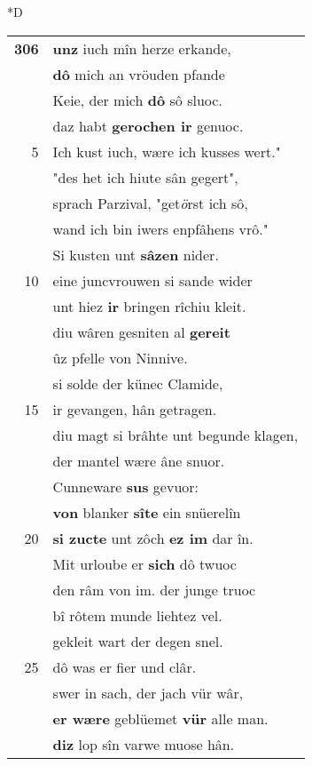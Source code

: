 \documentclass[8pt,a4paper,notitlepage]{article}
\begin{document}
\begin{table}[ht]
\begin{minipage}[t]{0.5\linewidth}
\small
\begin{center}*D
\end{center}
\begin{tabular}{rl}
\textbf{306} & \textbf{unz} iuch mîn herze erkande,\\ 
 & \textbf{dô} mich an vröuden pfande\\ 
 & Keie, der mich \textbf{dô} sô sluoc.\\ 
 & daz habt \textbf{gerochen ir} genuoc.\\ 
5 & Ich kust iuch, wære ich kusses wert."\\ 
 & "des het ich hiute sân gegert",\\ 
 & sprach Parzival, "get\textit{ö}rst ich sô,\\ 
 & wand ich bin iwers enpfâhens vrô."\\ 
 & Si kusten unt \textbf{sâzen} nider.\\ 
10 & eine juncvrouwen si sande wider\\ 
 & unt hiez \textbf{ir} bringen rîchiu kleit.\\ 
 & diu wâren gesniten al \textbf{gereit}\\ 
 & ûz pfelle von Ninnive.\\ 
 & si solde der künec Clamide,\\ 
15 & ir gevangen, hân getragen.\\ 
 & diu magt si brâhte unt begunde klagen,\\ 
 & der mantel wære âne snuor.\\ 
 & Cunneware \textbf{sus} gevuor:\\ 
 & \textbf{von} blanker \textbf{sîte} ein snüerelîn\\ 
20 & \textbf{si zucte} unt zôch \textbf{ez im} dar în.\\ 
 & Mit urloube er \textbf{sich} dô twuoc\\ 
 & den râm von im. der junge truoc\\ 
 & bî rôtem munde liehtez vel.\\ 
 & gekleit wart der degen snel.\\ 
25 & dô was er fier und clâr.\\ 
 & swer in sach, der jach vür wâr,\\ 
 & \textbf{er wære} geblüemet \textbf{vür} alle man.\\ 
 & \textbf{diz} lop sîn varwe muose hân.\\ 

\end{tabular}
\end{minipage}
\end{table}
\end{document}

